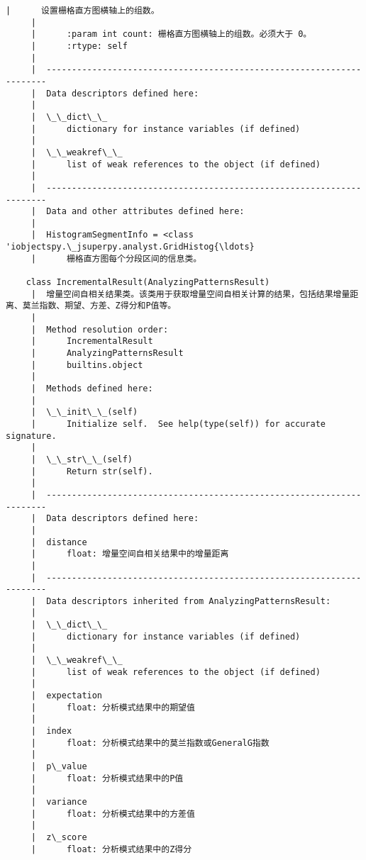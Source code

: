 \documentclass[11pt]{article}
\begin{document}
\begin{Verbatim}[commandchars=\\\{\}]
     |      设置栅格直方图横轴上的组数。
     |      
     |      :param int count: 栅格直方图横轴上的组数。必须大于 0。
     |      :rtype: self
     |  
     |  ----------------------------------------------------------------------
     |  Data descriptors defined here:
     |  
     |  \_\_dict\_\_
     |      dictionary for instance variables (if defined)
     |  
     |  \_\_weakref\_\_
     |      list of weak references to the object (if defined)
     |  
     |  ----------------------------------------------------------------------
     |  Data and other attributes defined here:
     |  
     |  HistogramSegmentInfo = <class 'iobjectspy.\_jsuperpy.analyst.GridHistog{\ldots}
     |      栅格直方图每个分段区间的信息类。
    
    class IncrementalResult(AnalyzingPatternsResult)
     |  增量空间自相关结果类。该类用于获取增量空间自相关计算的结果，包括结果增量距离、莫兰指数、期望、方差、Z得分和P值等。
     |  
     |  Method resolution order:
     |      IncrementalResult
     |      AnalyzingPatternsResult
     |      builtins.object
     |  
     |  Methods defined here:
     |  
     |  \_\_init\_\_(self)
     |      Initialize self.  See help(type(self)) for accurate signature.
     |  
     |  \_\_str\_\_(self)
     |      Return str(self).
     |  
     |  ----------------------------------------------------------------------
     |  Data descriptors defined here:
     |  
     |  distance
     |      float: 增量空间自相关结果中的增量距离
     |  
     |  ----------------------------------------------------------------------
     |  Data descriptors inherited from AnalyzingPatternsResult:
     |  
     |  \_\_dict\_\_
     |      dictionary for instance variables (if defined)
     |  
     |  \_\_weakref\_\_
     |      list of weak references to the object (if defined)
     |  
     |  expectation
     |      float: 分析模式结果中的期望值
     |  
     |  index
     |      float: 分析模式结果中的莫兰指数或GeneralG指数
     |  
     |  p\_value
     |      float: 分析模式结果中的P值
     |  
     |  variance
     |      float: 分析模式结果中的方差值
     |  
     |  z\_score
     |      float: 分析模式结果中的Z得分
    

\end{Verbatim}
\end{document}
